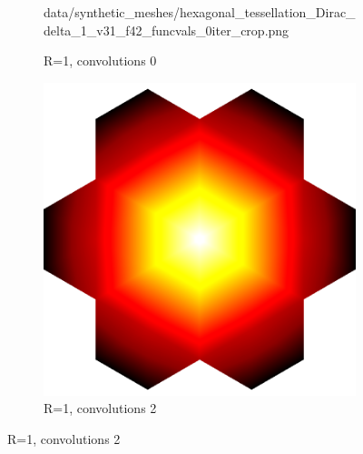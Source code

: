 \begin{figure}[ht]
\begin{subfigure}[b]{0.32\linewidth}
		{data/synthetic_meshes/hexagonal_tessellation_Dirac_delta_1_v31_f42_funcvals_0iter_crop.png}
		\caption{R=1, convolutions 0}\label{fig:hex.b}
	\end{subfigure}
	\begin{subfigure}[b]{0.32\linewidth}
		\includegraphics[width=\linewidth]
		{data/synthetic_meshes/hexagonal_tessellation_Dirac_delta_1_v31_f42_funcvals_2iter_crop.png}
		\caption{R=1, convolutions 2}\label{fig:hex.c}
	\end{subfigure}


\end{figure}
